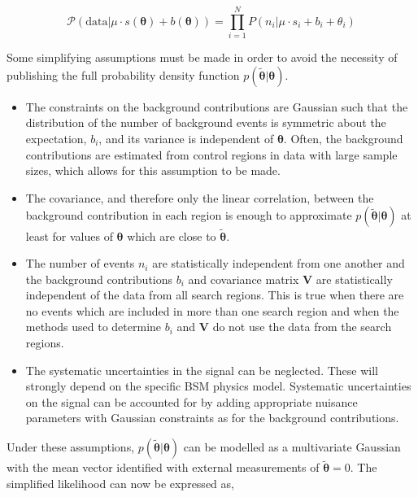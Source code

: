 \begin{equation}
\mathcal{P}(\mathrm{data}|\mu\cdot s(\boldsymbol{\theta}) + b(\boldsymbol{\theta})) = \prod_{i=1}^{N} P(n_{i}|\mu \cdot s_{i}+b_{i}+\theta_{i})
\label{eq:poisson-prob}
\end{equation}

Some simplifying assumptions must be made in order to avoid the necessity of publishing the full probability density function $p(\tilde{\boldsymbol{\theta}}|\boldsymbol{\theta})$. 

\begin{itemize}
\item{The constraints on the background contributions are Gaussian such that the distribution of the number of background events is symmetric about the expectation, $b_{i}$, 
and its variance is independent of $\boldsymbol{\theta}$. Often, the background contributions are estimated from control regions in data with large sample sizes, which allows for this 
assumption to be made.}

\item{The covariance, and therefore only the linear correlation, between the background contribution in each region is enough to approximate $p(\tilde{\boldsymbol{\theta}}|\boldsymbol{\theta})$ 
at least for values of $\boldsymbol{\theta}$ which are close to $\tilde{\boldsymbol{\theta}}$.}

\item{The number of events $n_{i}$ are statistically independent from one another and the background contributions $b_{i}$ and covariance matrix $\mathrm{\mathbf{V}}$ are 
statistically independent of the data from all search regions. This is true when there are no events which are included in more than one search region and when the methods used to 
determine $b_{i}$ and $\mathrm{\mathbf{V}}$ do not use the data from the search regions.}

\item{The systematic uncertainties in the signal can be neglected. These will strongly depend on the specific BSM physics model. 
Systematic uncertainties on the signal can be accounted for by adding appropriate nuisance parameters with Gaussian constraints 
as for the background contributions. }
\end{itemize}

Under these assumptions, $p(\tilde{\boldsymbol{\theta}}|\boldsymbol{\theta})$ can be modelled as a multivariate Gaussian with the mean vector identified with external measurements of 
$\tilde{\boldsymbol{\theta}}=0$. The simplified likelihood can now be expressed as,

